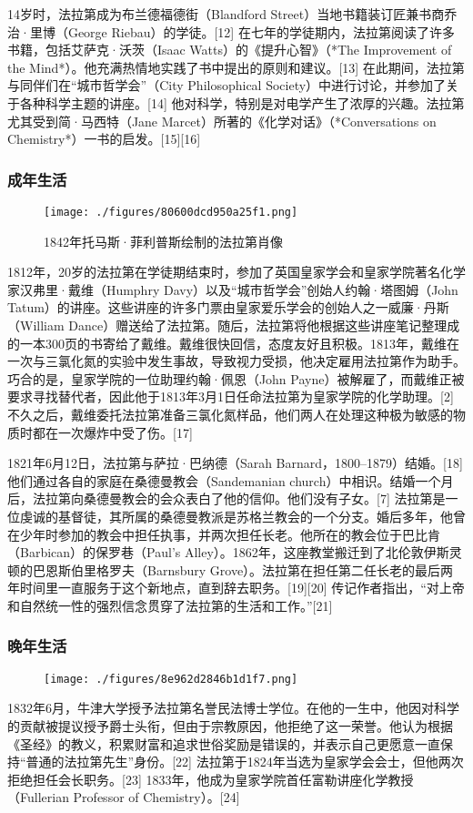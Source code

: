 14岁时，法拉第成为布兰德福德街（Blandford Street）当地书籍装订匠兼书商乔治·里博（George Riebau）的学徒。[12] 在七年的学徒期内，法拉第阅读了许多书籍，包括艾萨克·沃茨（Isaac Watts）的《提升心智》（*The Improvement of the Mind*）。他充满热情地实践了书中提出的原则和建议。[13] 在此期间，法拉第与同伴们在“城市哲学会”（City Philosophical Society）中进行讨论，并参加了关于各种科学主题的讲座。[14] 他对科学，特别是对电学产生了浓厚的兴趣。法拉第尤其受到简·马西特（Jane Marcet）所著的《化学对话》（*Conversations on Chemistry*）一书的启发。[15][16]
\subsubsection{成年生活}
\begin{figure}[ht]
\centering
\texttt{[image: ./figures/80600dcd950a25f1.png]}
\caption{1842年托马斯·菲利普斯绘制的法拉第肖像} \label{fig_FLD_1}
\end{figure}
1812年，20岁的法拉第在学徒期结束时，参加了英国皇家学会和皇家学院著名化学家汉弗里·戴维（Humphry Davy）以及“城市哲学会”创始人约翰·塔图姆（John Tatum）的讲座。这些讲座的许多门票由皇家爱乐学会的创始人之一威廉·丹斯（William Dance）赠送给了法拉第。随后，法拉第将他根据这些讲座笔记整理成的一本300页的书寄给了戴维。戴维很快回信，态度友好且积极。1813年，戴维在一次与三氯化氮的实验中发生事故，导致视力受损，他决定雇用法拉第作为助手。巧合的是，皇家学院的一位助理约翰·佩恩（John Payne）被解雇了，而戴维正被要求寻找替代者，因此他于1813年3月1日任命法拉第为皇家学院的化学助理。[2] 不久之后，戴维委托法拉第准备三氯化氮样品，他们两人在处理这种极为敏感的物质时都在一次爆炸中受了伤。[17]

1821年6月12日，法拉第与萨拉·巴纳德（Sarah Barnard，1800–1879）结婚。[18] 他们通过各自的家庭在桑德曼教会（Sandemanian church）中相识。结婚一个月后，法拉第向桑德曼教会的会众表白了他的信仰。他们没有子女。[7] 法拉第是一位虔诚的基督徒，其所属的桑德曼教派是苏格兰教会的一个分支。婚后多年，他曾在少年时参加的教会中担任执事，并两次担任长老。他所在的教会位于巴比肯（Barbican）的保罗巷（Paul's Alley）。1862年，这座教堂搬迁到了北伦敦伊斯灵顿的巴恩斯伯里格罗夫（Barnsbury Grove）。法拉第在担任第二任长老的最后两年时间里一直服务于这个新地点，直到辞去职务。[19][20] 传记作者指出，“对上帝和自然统一性的强烈信念贯穿了法拉第的生活和工作。”[21]
\subsubsection{晚年生活}
\begin{figure}[ht]
\centering
\texttt{[image: ./figures/8e962d2846b1d1f7.png]}
\caption{} \label{fig_FLD_4}
\end{figure}
1832年6月，牛津大学授予法拉第名誉民法博士学位。在他的一生中，他因对科学的贡献被提议授予爵士头衔，但由于宗教原因，他拒绝了这一荣誉。他认为根据《圣经》的教义，积累财富和追求世俗奖励是错误的，并表示自己更愿意一直保持“普通的法拉第先生”身份。[22] 法拉第于1824年当选为皇家学会会士，但他两次拒绝担任会长职务。[23] 1833年，他成为皇家学院首任富勒讲座化学教授（Fullerian Professor of Chemistry）。[24]  

